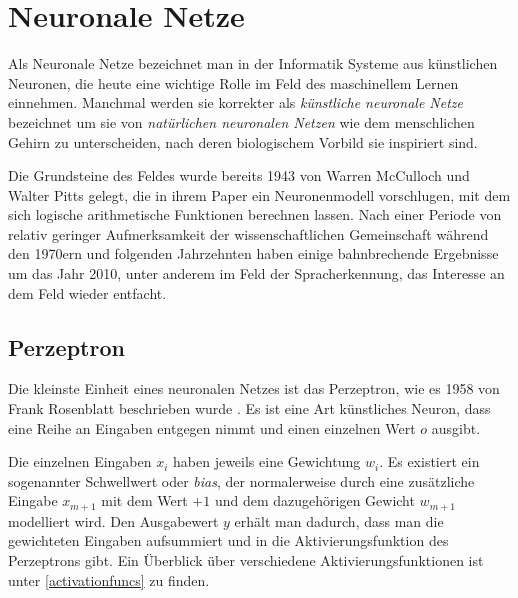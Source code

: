 \section{Neuronale Netze}

Als Neuronale Netze  %
bezeichnet man in der Informatik Systeme aus künstlichen Neuronen, die heute eine wichtige Rolle im Feld des maschinellem Lernen einnehmen.
Manchmal werden sie korrekter als \textit{künstliche neuronale Netze} bezeichnet um sie von \textit{natürlichen neuronalen Netzen} 
wie dem menschlichen Gehirn zu unterscheiden, nach deren biologischem Vorbild sie inspiriert sind.

Die Grundsteine des Feldes wurde bereits 1943 von Warren McCulloch und Walter Pitts gelegt, 
die in ihrem Paper \cite{mcculloch1943logical} ein Neuronenmodell vorschlugen, mit dem sich logische arithmetische Funktionen berechnen lassen. 
Nach einer Periode von relativ geringer Aufmerksamkeit der wissenschaftlichen Gemeinschaft während den 1970ern und folgenden Jahrzehnten 
haben einige bahnbrechende Ergebnisse um das Jahr 2010, unter anderem im Feld der Spracherkennung, das Interesse an dem Feld wieder entfacht. 



\subsection{Perzeptron}
Die kleinste Einheit eines neuronalen Netzes ist das Perzeptron, wie es 1958 von Frank Rosenblatt beschrieben wurde \cite{rosenblatt1958perceptron}.
Es ist eine Art künstliches Neuron, dass eine Reihe an Eingaben entgegen nimmt und einen einzelnen Wert $o$ ausgibt.


Die einzelnen Eingaben $x_i$ haben jeweils eine Gewichtung $w_i$.
Es existiert ein sogenannter Schwellwert oder \textit{bias}, der normalerweise 
durch eine zusätzliche Eingabe $x_{m+1}$ mit dem Wert $+1$ und dem dazugehörigen Gewicht $w_{m+1}$ modelliert wird.
Den Ausgabewert $y$ erhält man dadurch, dass man die gewichteten Eingaben aufsummiert und in die Aktivierungsfunktion des Perzeptrons gibt.
Ein Überblick über verschiedene Aktivierungsfunktionen ist unter \ref{activationfuncs} zu finden.

